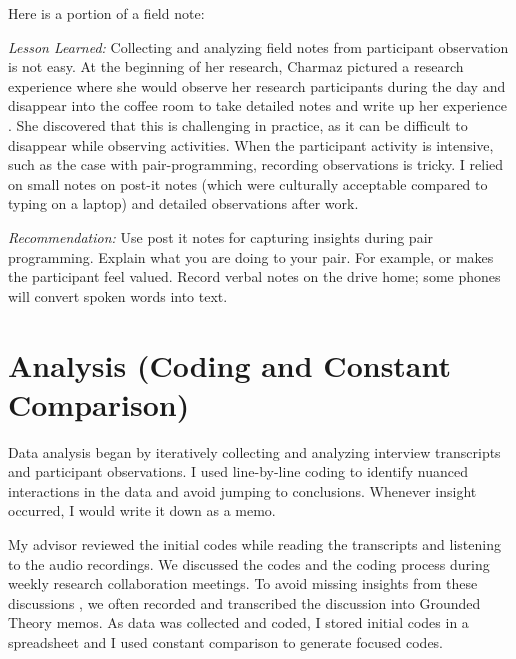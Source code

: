 Here is a portion of a field note: 

\textit{Lesson Learned:} Collecting and analyzing field notes from participant observation is not easy. At the beginning of her research, Charmaz pictured a research experience where she would observe her research participants during the day and disappear into the coffee room to take detailed notes and write up her experience \cite{Charmaz}. She discovered that this is challenging in practice, as it can be difficult to disappear while observing activities. When the participant activity is intensive, such as the case with pair-programming, recording observations is tricky. I relied on small notes on post-it notes (which were culturally acceptable compared to typing on a laptop) and detailed observations after work.

\textit{Recommendation:} Use post it notes for capturing insights during pair programming. Explain what you are doing to your pair. For example,  or  makes the participant feel valued. Record verbal notes on the drive home; some phones will convert spoken words into text.
\section{ Analysis (Coding and Constant Comparison) }
\label{Analysis}
Data analysis began by iteratively collecting and analyzing interview transcripts and participant observations. I used line-by-line coding \cite{Charmaz} to identify nuanced interactions in the data and avoid jumping to conclusions. Whenever insight occurred, I would write it down as a memo.

My advisor reviewed the initial codes while reading the transcripts and listening to the audio recordings.  We discussed the codes and the coding process during weekly research collaboration meetings. To avoid missing insights from these discussions \cite{GlaserTheoreticalSensitivity}, we often recorded and transcribed the discussion into Grounded Theory memos. As data was collected and coded, I stored initial codes in a spreadsheet and I used constant comparison to generate focused codes.

